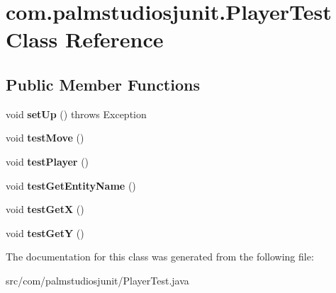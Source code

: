 \hypertarget{classcom_1_1palmstudiosjunit_1_1_player_test}{}\section{com.\+palmstudiosjunit.\+Player\+Test Class Reference}
\label{classcom_1_1palmstudiosjunit_1_1_player_test}
\subsection*{Public Member Functions}
\begin{DoxyCompactItemize}
\item 
\mbox{\label{classcom_1_1palmstudiosjunit_1_1_player_test_a7b31d2c235b2a2336fcdd1abe609e1f6}} 
void {\bfseries set\+Up} ()  throws Exception 	
\item 
\mbox{\label{classcom_1_1palmstudiosjunit_1_1_player_test_aa2fa002a95f91011c128f750ff41075c}} 
void {\bfseries test\+Move} ()
\item 
\mbox{\label{classcom_1_1palmstudiosjunit_1_1_player_test_aaee427f84da31e21c2925b4df351a4e5}} 
void {\bfseries test\+Player} ()
\item 
\mbox{\label{classcom_1_1palmstudiosjunit_1_1_player_test_a43b0fa088de20524c96ecdd006eabca8}} 
void {\bfseries test\+Get\+Entity\+Name} ()
\item 
\mbox{\label{classcom_1_1palmstudiosjunit_1_1_player_test_a76f5ae0e9d3ace3f2b34ef60d7eb0f99}} 
void {\bfseries test\+GetX} ()
\item 
\mbox{\label{classcom_1_1palmstudiosjunit_1_1_player_test_a774fed2f7a72658d8cfe3d03e6692e0d}} 
void {\bfseries test\+GetY} ()
\end{DoxyCompactItemize}


The documentation for this class was generated from the following file\+:\begin{DoxyCompactItemize}
\item 
src/com/palmstudiosjunit/Player\+Test.\+java\end{DoxyCompactItemize}
